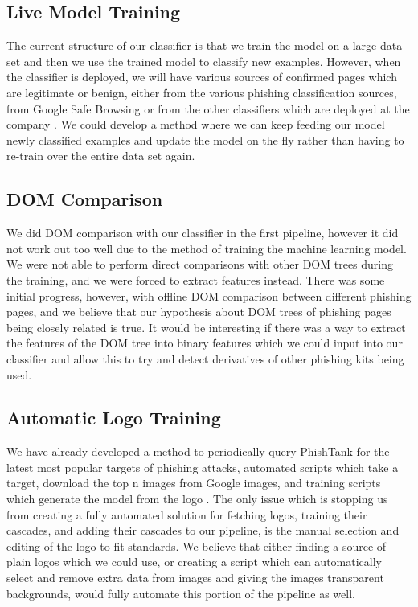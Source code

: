 \documentclass[12pt,twoside]{report}
\begin{document}
\subsection{Live Model Training}
The current structure of our classifier is that we train the model on a large data set and then we use the trained model to classify new examples. However, when the classifier is deployed, we will have various sources of confirmed pages which are legitimate or benign, either from the various phishing classification sources, from Google Safe Browsing or from the other classifiers which are deployed at the company \cite{safebrowsing}. We could develop a method where we can keep feeding our model newly classified examples and update the model on the fly rather than having to re-train over the entire data set again.
\subsection{DOM Comparison}
We did DOM comparison with our classifier in the first pipeline, however it did not work out too well due to the method of training the machine learning model. We were not able to perform direct comparisons with other DOM trees during the training, and we were forced to extract features instead. There was some initial progress, however, with offline DOM comparison between different phishing pages, and we believe that our hypothesis about DOM trees of phishing pages being closely related is true. It would be interesting if there was a way to extract the features of the DOM tree into binary features which we could input into our classifier and allow this to try and detect derivatives of other phishing kits being used.
\subsection{Automatic Logo Training}
We have already developed a method to periodically query PhishTank for the latest most popular targets of phishing attacks, automated scripts which take a target, download the top n images from Google images, and training scripts which generate the model from the logo \cite{phishtank}. The only issue which is stopping us from creating a fully automated solution for fetching logos, training their cascades, and adding their cascades to our pipeline, is the manual selection and editing of the logo to fit standards. We believe that either finding a source of plain logos which we could use, or creating a script which can automatically select and remove extra data from images and giving the images transparent backgrounds, would fully automate this portion of the pipeline as well.
\end{document}
